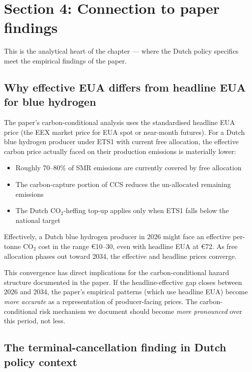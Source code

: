 \documentclass[11pt,a4paper]{article}
\begin{document}
\newpage

\section{Section 4: Connection to paper findings}

This is the analytical heart of the chapter --- where the Dutch policy specifics meet the empirical findings of the paper.

\subsection{Why effective EUA differs from headline EUA for blue hydrogen}

The paper's carbon-conditional analysis uses the standardised headline EUA price (the EEX market price for EUA spot or near-month futures). For a Dutch blue hydrogen producer under ETS1 with current free allocation, the effective carbon price actually faced on their production emissions is materially lower:

\begin{itemize}
  \item Roughly 70--80\% of SMR emissions are currently covered by free allocation
  \item The carbon-capture portion of CCS reduces the un-allocated remaining emissions
  \item The Dutch CO$_2$-heffing top-up applies only when ETS1 falls below the national target
\end{itemize}

Effectively, a Dutch blue hydrogen producer in 2026 might face an effective per-tonne CO$_2$ cost in the range \euro 10--30, even with headline EUA at \euro 72. As free allocation phases out toward 2034, the effective and headline prices converge.

\begin{technote}
This convergence has direct implications for the carbon-conditional hazard structure documented in the paper. If the headline-effective gap closes between 2026 and 2034, the paper's empirical patterns (which use headline EUA) become \emph{more accurate} as a representation of producer-facing prices. The carbon-conditional risk mechanism we document should become \emph{more pronounced} over this period, not less.
\end{technote}

\subsection{The terminal-cancellation finding in Dutch policy context}
\end{document}
